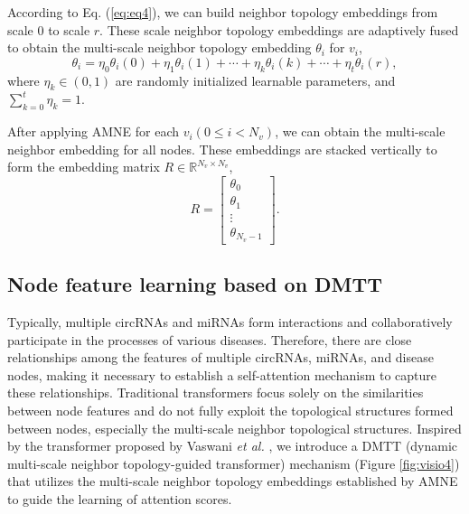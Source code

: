 \documentclass[journal,twoside,web]{ieeecolor}
\begin{document}
According to Eq. (\ref{eq:eq4}), we can build neighbor topology embeddings from scale 0 to scale $r$. These scale neighbor topology embeddings are adaptively fused to obtain the multi-scale neighbor topology embedding $\theta _i$ for $v_i$,
\begin{equation}
\label{eq:eq5}
\theta _i = \eta_0  \theta _i{(0)} + \eta_1 \theta _i{(1)} + \cdots + \eta_k \theta _i{(k)} + \cdots + \eta_t \theta _i{(r)},
\end{equation}
where $\eta_k \in (0, 1)$ are randomly initialized learnable parameters, and $\sum_{k=0}^{t}\eta_k = 1$.

After applying AMNE for each $v_i(0 \leqslant i < N_v)$, we can obtain the multi-scale neighbor embedding for all nodes. These embeddings are stacked vertically to form the embedding matrix $R \in \mathbb{R}^{N_v \times N_v}$,
\begin{equation}
\label{eq:eq6}
	R = \left[\begin{array}{cccc}
		\theta _0\\
		\theta _1\\
		\vdots\\
		\theta _{N_v-1}
	\end{array}\right].
\end{equation}

\subsection{Node feature learning based on DMTT}

Typically, multiple circRNAs and miRNAs form interactions and collaboratively participate in the processes of various diseases. Therefore, there are close relationships among the features of multiple circRNAs, miRNAs, and disease nodes, making it necessary to establish a self-attention mechanism to capture these relationships. Traditional transformers focus solely on the similarities between node features and do not fully exploit the topological structures formed between nodes, especially the multi-scale neighbor topological structures. Inspired by the transformer proposed by Vaswani {\it et al.} \cite{vaswani2017attention}, we introduce a DMTT (dynamic multi-scale neighbor topology-guided transformer) mechanism (Figure \ref{fig:visio4}) that utilizes the multi-scale neighbor topology embeddings established by AMNE to guide the learning of attention scores.
\end{document}
